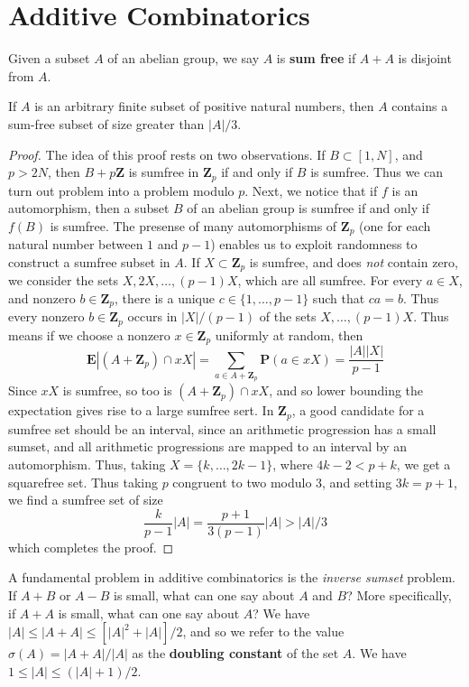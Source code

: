 \chapter{Additive Combinatorics}

Given a subset $A$ of an abelian group, we say $A$ is {\bf sum free} if $A + A$ is disjoint from $A$.

\begin{theorem}
    If $A$ is an arbitrary finite subset of positive natural numbers, then $A$ contains a sum-free subset of size greater than $|A|/3$.
\end{theorem}
\begin{proof}
    The idea of this proof rests on two observations. If $B \subset [1,N]$, and $p > 2N$, then $B + p \mathbf{Z}$ is sumfree in $\mathbf{Z}_p$ if and only if $B$ is sumfree. Thus we can turn out problem into a problem modulo $p$. Next, we notice that if $f$ is an automorphism, then a subset $B$ of an abelian group is sumfree if and only if $f(B)$ is sumfree. The presense of many automorphisms of $\mathbf{Z}_p$ (one for each natural number between $1$ and $p-1$) enables us to exploit randomness to construct a sumfree subset in $A$. If $X \subset \mathbf{Z}_p$ is sumfree, and does {\it not} contain zero, we consider the sets $X,2X, \dots, (p-1)X$, which are all sumfree. For every $a \in X$, and nonzero $b \in \mathbf{Z}_p$, there is a unique $c \in \{ 1, \dots, p-1 \}$ such that $ca = b$. Thus every nonzero $b \in \mathbf{Z}_p$ occurs in $|X|/(p-1)$ of the sets $X,\dots, (p-1)X$. Thus means if we choose a nonzero $x \in \mathbf{Z}_p$ uniformly at random, then
    \[ \mathbf{E} |(A + \mathbf{Z}_p) \cap xX| = \sum_{a \in A + \mathbf{Z}_p} \mathbf{P}(a \in xX) = \frac{|A| |X|}{p-1} \]
    Since $xX$ is sumfree, so too is $(A + \mathbf{Z}_p) \cap xX$, and so lower bounding the expectation gives rise to a large sumfree sert. In $\mathbf{Z}_p$, a good candidate for a sumfree set should be an interval, since an arithmetic progression has a small sumset, and all arithmetic progressions are mapped to an interval by an automorphism. Thus, taking $X = \{ k, \dots, 2k - 1 \}$, where $4k - 2 < p + k$, we get a squarefree set. Thus taking $p$ congruent to two modulo 3, and setting $3k = p + 1$, we find a sumfree set of size
    \[ \frac{k}{p-1} |A| = \frac{p + 1}{3(p-1)} |A| > |A|/3 \]
    which completes the proof.
\end{proof}

A fundamental problem in additive combinatorics is the {\it inverse sumset} problem. If $A + B$ or $A - B$ is small, what can one say about $A$ and $B$? More specifically, if $A + A$ is small, what can one say about $A$? We have $|A| \leq |A + A| \leq [|A|^2 + |A|]/2$, and so we refer to the value $\sigma(A) = |A + A|/|A|$ as the {\bf doubling constant} of the set $A$. We have $1 \leq |A| \leq (|A| + 1)/2$.

